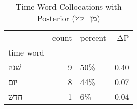 \begin{table}[htbp!]
\centering
\caption{Time Word Collocations with Posterior (מן+קץ)}
\label{table:postמן+קץ_head_cpd}
\begin{tabular}{lrlr}
\toprule
{} &  count & percent &    ΔP \\
time word &        &         &       \\
\midrule
שׁנה      &      9 &     50\% &  0.40 \\
יום       &      8 &     44\% &  0.07 \\
חדשׁ      &      1 &      6\% &  0.04 \\
\bottomrule
\end{tabular}
\end{table}
